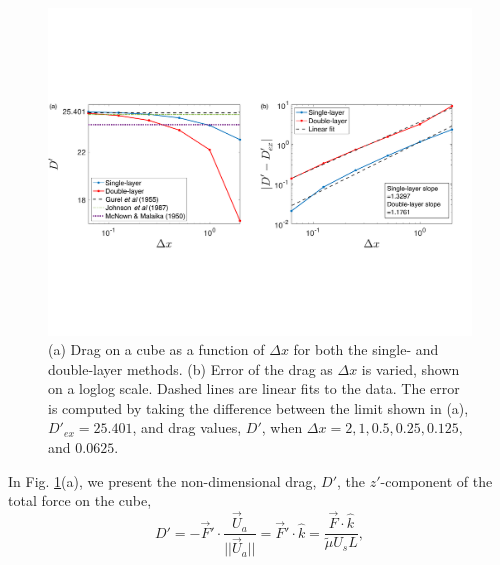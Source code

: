 \begin{figure}[ht]
	\begin{center}
		\includegraphics[scale=0.5]{figures/fig_compare_drag_error}
	\end{center}
	\caption{(a) Drag on a cube as a function of $\Delta x$ for both the single- and double-layer methods. (b) Error of the drag as $\Delta x$ is varied, shown on a loglog scale. Dashed lines are linear fits to the data. The error is computed by taking the difference between the limit shown in (a), $D'_{ex} = 25.401$, and drag values, $D'$, when $\Delta x = 2, 1, 0.5,   0.25,  0.125,$ and $0.0625$. }
	\label{fig_drag_compare}
\end{figure}
In  Fig. \ref{fig_drag_compare}(a), we present the non-dimensional drag, $D'$, the $z'$-component of the total force on the cube, 
\begin{equation}
D' = -\vec{F}' \cdot \frac{\vec{U}_a}{||\vec{U}_a||} =  \vec{F}' \cdot \hat{k} =  \frac{\vec{F} \cdot \hat{k}}{ \tilde{\mu} U_s L}, 
\label{eq_drag}
\end{equation}

